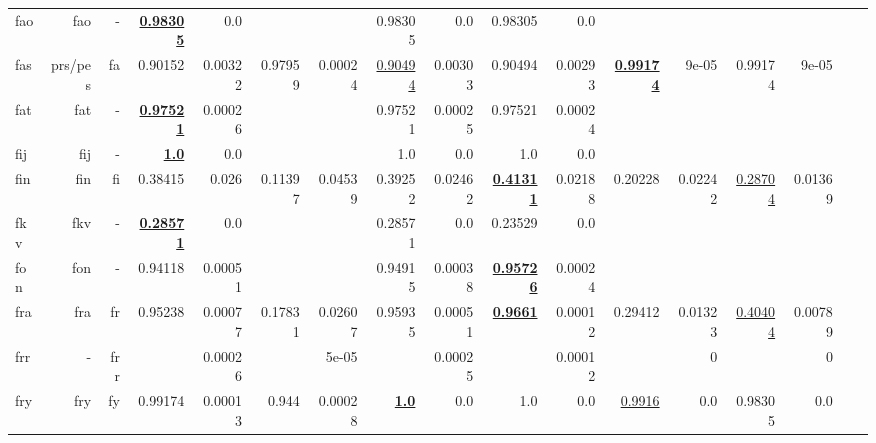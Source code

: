 \documentclass[11pt]{article}
\begin{document}
\begin{table*}[h]
{\begin{tabular}{lrrrrrrrrrrrrrrrr}
fao         & fao         & -         & \textbf{\underline{0.98305}}         & 0.0         &          &          & 0.98305         & 0.0         & 0.98305         & 0.0         &          &          &          &          \\
fas         & prs/pes         & fa         & 0.90152         & 0.00322         & 0.97959         & 0.00024         & \underline{0.90494}         & 0.00303         & 0.90494         & 0.00293         & \textbf{\underline{0.99174}}         & 9e-05         & 0.99174         & 9e-05         \\
fat         & fat         & -         & \textbf{\underline{0.97521}}         & 0.00026         &          &          & 0.97521         & 0.00025         & 0.97521         & 0.00024         &          &          &          &          \\
fij         & fij         & -         & \textbf{\underline{1.0}}         & 0.0         &          &          & 1.0         & 0.0         & 1.0         & 0.0         &          &          &          &          \\
fin         & fin         & fi         & 0.38415         & 0.026         & 0.11397         & 0.04539         & 0.39252         & 0.02462         & \textbf{\underline{0.41311}}         & 0.02188         & 0.20228         & 0.02242         & \underline{0.28704}         & 0.01369         \\
fkv         & fkv         & -         & \textbf{\underline{0.28571}}         & 0.0         &          &          & 0.28571         & 0.0         & 0.23529         & 0.0         &          &          &          &          \\
fon         & fon         & -         & 0.94118         & 0.00051         &          &          & 0.94915         & 0.00038         & \textbf{\underline{0.95726}}         & 0.00024         &          &          &          &          \\
fra         & fra         & fr         & 0.95238         & 0.00077         & 0.17831         & 0.02607         & 0.95935         & 0.00051         & \textbf{\underline{0.9661}}         & 0.00012         & 0.29412         & 0.01323         & \underline{0.40404}         & 0.00789         \\
frr         & -         & frr         &          & 0.00026         &          & 5e-05         &          & 0.00025         &          & 0.00012         &          & 0         &          & 0         \\
fry         & fry         & fy         & 0.99174         & 0.00013         & 0.944         & 0.00028         & \textbf{\underline{1.0}}         & 0.0         & 1.0         & 0.0         & \underline{0.9916}         & 0.0         & 0.98305         & 0.0         \\

\end{tabular}}
\end{table*}
\end{document}
